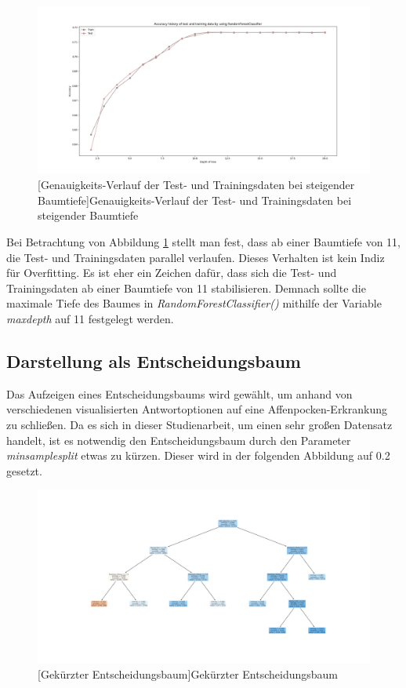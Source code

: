 \documentclass[13pt,a4paper, listof=entryprefix, bibliography=totocnumbered,toc=listofnumbered,lof=listofnumbered]{scrartcl}
\begin{document}
	\begin{figure}[H]
		\centering
		\includegraphics[width=0.8\linewidth]{Bilder/overfitting_plot.png}
		[Genauigkeits-Verlauf der Test- und Trainingsdaten bei steigender Baumtiefe]{Genauigkeits-Verlauf der Test- und Trainingsdaten bei steigender Baumtiefe}
		\label{fig:overfitting}
	\end{figure}

Bei Betrachtung von Abbildung \ref{fig:overfitting} stellt man fest, dass ab einer Baumtiefe von 11, die Test- und Trainingsdaten parallel 
verlaufen. Dieses Verhalten ist kein Indiz für Overfitting. Es ist eher ein Zeichen dafür, dass sich die Test- und Trainingsdaten ab einer
Baumtiefe von 11 stabilisieren. Demnach sollte die maximale Tiefe des Baumes in \textit{RandomForestClassifier()} mithilfe der Variable \textit{max\textunderscore depth} 
auf 11 festgelegt werden.  
 
	\subsection{Darstellung als Entscheidungsbaum}
		\label{ch:entscheidungsbaum}

Das Aufzeigen eines Entscheidungsbaums wird gewählt, um anhand von verschiedenen visualisierten Antwortoptionen auf eine Affenpocken-Erkrankung zu schließen.
Da es sich in dieser Studienarbeit, um einen sehr großen Datensatz handelt, ist es notwendig den Entscheidungsbaum durch den Parameter \textit{min\textunderscore sample\textunderscore split}
etwas zu kürzen. Dieser wird in der folgenden Abbildung auf 0.2 gesetzt. 

	\begin{figure}[H]
		\centering
		\includegraphics[width=0.8\linewidth]{Bilder/decision_tree.png}
		[Gekürzter Entscheidungsbaum]{Gekürzter Entscheidungsbaum}
		\label{fig:decisiontree}
	\end{figure}
\end{document}
